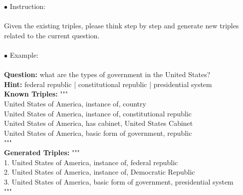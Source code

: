 

\begin{tcolorbox}[prompt=
{\begin{prompt} \label{prompts for generating triples}The Prompt for Triple Generation
\end{prompt}}]
$\bullet$ Instruction: \\ \\
Given the existing triples, please think step by step and generate new triples related to the current question. \\
\\
$\bullet$ Example: \\ \\
\textbf{Question:} what are the types of government in the United States? \\
\textcolor[rgb]{0.98,0.4,0.5}{\textbf{Hint:} federal republic | constitutional republic | presidential system} \\
\textbf{Known Triples: }""" \\
United States of America, instance of, country \\
United States of America, instance of, constitutional republic \\
United States of America, has cabinet, United States Cabinet \\
United States of America, basic form of government, republic \\
""" \\
\textbf{Generated Triples: }""" \\
1. United States of America, instance of, federal republic \\
2. United States of America, instance of, Democratic Republic \\
3. United States of America, basic form of government, presidential system \\
""" 
\end{tcolorbox}